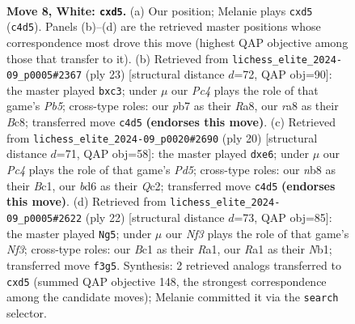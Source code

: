 \documentclass[11pt]{article}
\begin{document}
\begin{figure}[p]\centering
\begin{subfigure}{0.46\textwidth}\centering
\resizebox{\linewidth}{!}{%
\newchessgame
\chessboard[
  setfen={rnbq1rk1/pp4pp/2pbpn2/3p1p2/2PP4/1P3NP1/P3PPBP/RNBQ1RK1 w - - 1 8},
  showmover=false,
  pgfstyle=straightmove, color=movearrow, markmove={c4-d5}
]}
\caption{}
\end{subfigure}\hfill
\begin{subfigure}{0.46\textwidth}\centering
\resizebox{\linewidth}{!}{%
\newchessgame
\chessboard[
  setfen={r1bq1rk1/p2nppbp/3p2p1/n1pP4/1p2PB2/P1P2N1P/1PB2PP1/RN1QR1K1 b - - 0 12},
  showmover=false,
  pgfstyle=straightmove, color=movearrow, markmove={b4-c3}
]}
\caption{}
\end{subfigure}
\\[4pt]
\begin{subfigure}{0.46\textwidth}\centering
\resizebox{\linewidth}{!}{%
\newchessgame
\chessboard[
  setfen={r1bnqrk1/1pp1b1pp/3ppn2/p2P1p2/2P5/P1N2NP1/1PQ1PPBP/R1B2RK1 w - - 1 11},
  showmover=false,
  pgfstyle=straightmove, color=movearrow, markmove={d5-e6}
]}
\caption{}
\end{subfigure}\hfill
\begin{subfigure}{0.46\textwidth}\centering
\resizebox{\linewidth}{!}{%
\newchessgame
\chessboard[
  setfen={r1bq1rk1/p2nb1pp/2p1pn2/P1pp1p2/1P1P4/5NP1/4PPBP/RNBQ1RK1 w - - 0 12},
  showmover=false,
  pgfstyle=straightmove, color=movearrow, markmove={f3-g5}
]}
\caption{}
\end{subfigure}
\caption{\textbf{Move 8, White: \texttt{cxd5}.} (a) Our position; Melanie plays \texttt{cxd5} (\texttt{c4d5}). Panels (b)--(d) are the retrieved master positions whose correspondence most drove this move (highest QAP objective among those that transfer to it). (b) Retrieved from \texttt{lichess\_elite\_2024-09\_p0005\#2367} (ply 23) [structural distance $d$=72, QAP obj=90]: the master played \texttt{bxc3}; under $\mu$ our \emph{Pc4} plays the role of that game's \emph{Pb5}; cross-type roles: our \emph{p}b7 as their \emph{R}a8, our \emph{r}a8 as their \emph{B}c8; transferred move \texttt{c4d5} \textbf{(endorses this move)}. (c) Retrieved from \texttt{lichess\_elite\_2024-09\_p0020\#2690} (ply 20) [structural distance $d$=71, QAP obj=58]: the master played \texttt{dxe6}; under $\mu$ our \emph{Pc4} plays the role of that game's \emph{Pd5}; cross-type roles: our \emph{n}b8 as their \emph{B}c1, our \emph{b}d6 as their \emph{Q}c2; transferred move \texttt{c4d5} \textbf{(endorses this move)}. (d) Retrieved from \texttt{lichess\_elite\_2024-09\_p0005\#2622} (ply 22) [structural distance $d$=73, QAP obj=85]: the master played \texttt{Ng5}; under $\mu$ our \emph{Nf3} plays the role of that game's \emph{Nf3}; cross-type roles: our \emph{B}c1 as their \emph{R}a1, our \emph{R}a1 as their \emph{N}b1; transferred move \texttt{f3g5}. Synthesis: 2 retrieved analogs transferred to \texttt{cxd5} (summed QAP objective 148, the strongest correspondence among the candidate moves); Melanie committed it via the \texttt{search} selector.}
\label{fig:thought-m14}
\end{figure}
\end{document}
